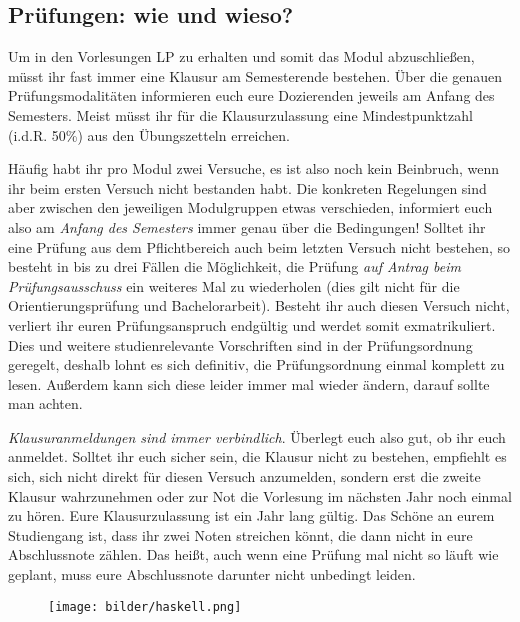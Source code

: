 \subsection{Prüfungen: wie und wieso?}

Um in den Vorlesungen \gls{LP} zu erhalten und somit das Modul abzuschließen, müsst ihr fast immer eine Klausur am Semesterende bestehen. Über die genauen Prüfungsmodalitäten informieren euch eure Dozierenden jeweils am Anfang des Semesters. Meist müsst ihr für die Klausurzulassung eine Mindestpunktzahl (i.d.R. 50\%) aus den Übungszetteln erreichen.

Häufig habt ihr pro Modul zwei Versuche, es ist also noch kein Beinbruch, wenn ihr beim ersten Versuch nicht bestanden habt. Die konkreten Regelungen sind aber zwischen den jeweiligen Modulgruppen etwas verschieden, informiert euch also am \emph{Anfang des Semesters} immer genau über die Bedingungen! Solltet ihr eine Prüfung aus dem Pflichtbereich auch beim letzten Versuch nicht bestehen, so besteht in bis zu drei Fällen die Möglichkeit, die Prüfung \emph{auf Antrag beim Prüfungsausschuss} ein weiteres Mal zu wiederholen (dies gilt nicht für die Orientierungsprüfung und Bachelorarbeit). Besteht ihr auch diesen Versuch nicht, verliert ihr euren Prüfungsanspruch endgültig und werdet somit exmatrikuliert. Dies und weitere studienrelevante Vorschriften sind in der Prüfungsordnung geregelt, deshalb lohnt es sich definitiv, die Prüfungsordnung einmal komplett zu lesen. Außerdem kann sich diese leider immer mal wieder ändern, darauf sollte man achten.

\emph{Klausuranmeldungen sind immer verbindlich}. Überlegt euch also gut, ob ihr euch anmeldet. Solltet ihr euch sicher sein, die Klausur nicht zu bestehen, empfiehlt es sich, sich nicht direkt für diesen Versuch anzumelden, sondern erst die zweite Klausur wahrzunehmen oder zur Not die Vorlesung im nächsten Jahr noch einmal zu hören. Eure Klausurzulassung ist ein Jahr lang gültig. Das Schöne an eurem Studiengang ist, dass ihr zwei Noten streichen könnt, die dann nicht in eure Abschlussnote zählen. Das heißt, auch wenn eine Prüfung mal nicht so läuft wie geplant, muss eure Abschlussnote darunter nicht unbedingt leiden.

\begin{figure}[t]
    \centering
    \texttt{[image: bilder/haskell.png]}
\end{figure}

